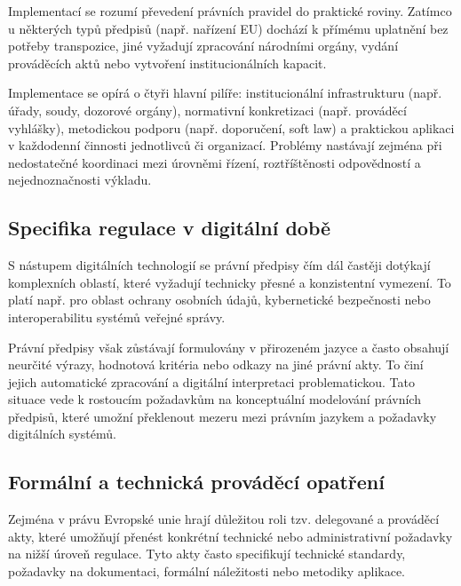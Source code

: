 Implementací se rozumí převedení právních pravidel do praktické roviny. Zatímco u některých typů předpisů (např. nařízení EU) dochází k přímému uplatnění bez potřeby transpozice, jiné vyžadují zpracování národními orgány, vydání prováděcích aktů nebo vytvoření institucionálních kapacit. \cite{Whelanova2022}

Implementace se opírá o čtyři hlavní pilíře: institucionální infrastrukturu (např. úřady, soudy, dozorové orgány), normativní konkretizaci (např. prováděcí vyhlášky), metodickou podporu (např. doporučení, soft law) a praktickou aplikaci v každodenní činnosti jednotlivců či organizací. Problémy nastávají zejména při nedostatečné koordinaci mezi úrovněmi řízení, roztříštěnosti odpovědností a nejednoznačnosti výkladu. \cite{Whelanova2022, Kunertova2011}


\subsection{Specifika regulace v digitální době}
\label{sec:regulace-v-digitalni-dobe}

S nástupem digitálních technologií se právní předpisy čím dál častěji dotýkají komplexních oblastí, které vyžadují technicky přesné a konzistentní vymezení. To platí např. pro oblast ochrany osobních údajů, kybernetické bezpečnosti nebo interoperabilitu systémů veřejné správy. \cite{Sarsfield2020}

Právní předpisy však zůstávají formulovány v přirozeném jazyce a často obsahují neurčité výrazy, hodnotová kritéria nebo odkazy na jiné právní akty. To činí jejich automatické zpracování a digitální interpretaci problematickou. Tato situace vede k rostoucím požadavkům na konceptuální modelování právních předpisů, které umožní překlenout mezeru mezi právním jazykem a požadavky digitálních systémů. \cite{Sarsfield2020}


\subsection{Formální a technická prováděcí opatření}
\label{sec:provadeci-opatreni}

Zejména v právu Evropské unie hrají důležitou roli tzv. delegované a prováděcí akty, které umožňují přenést konkrétní technické nebo administrativní požadavky na nižší úroveň regulace. Tyto akty často specifikují technické standardy, požadavky na dokumentaci, formální náležitosti nebo metodiky aplikace. \cite{Ward2009,Krumlova2009}

